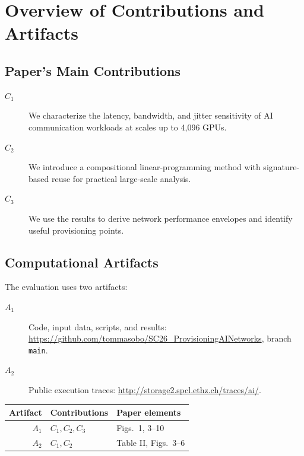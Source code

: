 \documentclass[conference]{IEEEtran}
\begin{document}


\appendixAD

\section{Overview of Contributions and Artifacts}

\subsection{Paper's Main Contributions}

\begin{description}
\item[$C_1$] We characterize the latency, bandwidth, and jitter
sensitivity of AI communication workloads at scales up to 4,096 GPUs.
\item[$C_2$] We introduce a compositional linear-programming method
with signature-based reuse for practical large-scale analysis.
\item[$C_3$] We use the results to derive network performance envelopes
and identify useful provisioning points.
\end{description}

\subsection{Computational Artifacts}

The evaluation uses two artifacts:

\begin{description}
\item[$A_1$] Code, input data, scripts, and results:
\url{https://github.com/tommasobo/SC26_ProvisioningAINetworks},
branch \texttt{main}.
\item[$A_2$] Public execution traces:
\url{http://storage2.spcl.ethz.ch/traces/ai/}.
\end{description}

\begin{center}
\small
\begin{tabular}{rll}
\toprule
Artifact & Contributions & Paper elements \\
\midrule
$A_1$ & $C_1,C_2,C_3$ & Figs.\ 1, 3--10 \\
$A_2$ & $C_1,C_2$ & Table II, Figs.\ 3--6 \\
\bottomrule
\end{tabular}
\end{center}
\end{document}
